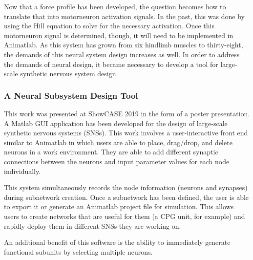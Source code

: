\documentclass[runningheads,a4paper]{llncs}
\begin{document}
		Now that a force profile has been developed, the question becomes how to translate that into motorneuron activation signals. In the past, this was done by using the Hill equation to solve for the necessary activation. Once this motorneuron signal is determined, though, it will need to be implemented in Animatlab. As this system has grown from six hindlimb muscles to thirty-eight, the demands of this neural system design increases as well. In order to address the demands of neural design, it became necessary to develop a tool for large-scale synthetic nervous system design.
	\subsubsection{A Neural Subsystem Design Tool}
		This work was presented at ShowCASE 2019 in the form of a poster presentation. A Matlab GUI application has been developed for the design of large-scale synthetic nervous systems (SNSs). This work involves a user-interactive front end similar to Animatlab in which users are able to place, drag/drop, and delete neurons in a work environment. They are able to add different synaptic connections between the neurons and input parameter values for each node individually. \par
		This system simultaneously records the node information (neurons and synapses) during subnetwork creation. Once a subnetwork has been defined, the user is able to export it or generate an Animatlab project file for simulation. This allows users to create networks that are useful for them (a CPG unit, for example) and rapidly deploy them in different SNSs they are working on. \par
		An additional benefit of this software is the ability to immediately generate functional subunits\cite{szczecinski_functional_2017} by selecting multiple neurons.  
		
	 
	
		
\end{document}
